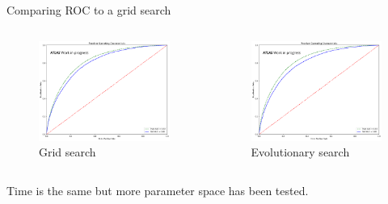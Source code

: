 \begin{frame}{Comparing ROC to a grid search}
    \begin{columns}
        \begin{column}{0.5\textwidth}
            \begin{figure}
                \centering
                \includegraphics[width = \textwidth]{grid_ROC.png}
                \caption{Grid search}
            \end{figure}
        \end{column}
        \begin{column}{0.5\textwidth}
            \begin{figure}
                \centering
                \includegraphics[width = \textwidth]{evo_ROC.png}
                \caption{Evolutionary search}
            \end{figure}
        \end{column}
    \end{columns}
    Time is the same but more parameter space has been tested.
\end{frame}


